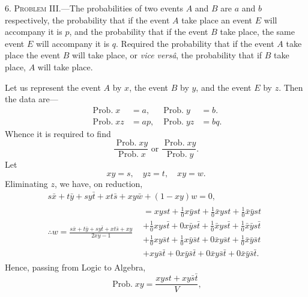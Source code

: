 \documentclass[oneside]{book}
\begin{document}
6. \textsc{Problem III.}---The probabilities of two events $A$ and $B$
are $a$ and $b$ respectively, the probability that if the event $A$ take
place an event $E$ will accompany it is $p$, and the probability that
if the event $B$ take place, the same event $E$ will accompany it
is $q$. Required the probability that if the event $A$ take place the
event $B$ will take place, or \textit{vice vers\^{a}}, the probability that if $B$
take place, $A$ will take place.

Let us represent the event $A$ by $x$, the event $B$ by $y$, and the
event $E$ by $z$. Then the data are---
\begin{align*}
\operatorname{Prob. } x & = a, & \operatorname{Prob. } y & = b. \\
\operatorname{Prob. } x z & = a p,& \operatorname{Prob. } y z & = b q.
\end{align*}
Whence it is required to find
\begin{equation*}
\frac{\operatorname{Prob. } x y}{\operatorname{Prob. } x} \text{ or }
\frac{\operatorname{Prob. } x y}{\operatorname{Prob. } y}.
\end{equation*}
Let
\begin{equation*}
xy=s, \quad yz = t, \quad xy=w.
\end{equation*}
Eliminating $z$, we have, on reduction,
\begin{gather*}
s \bar{x} + t \bar{y} + s y \bar{t} + x t \bar{s} + x y \bar{w}
+ (1 - x y)w = 0, \\
\therefore w = \frac{s \bar{x} + t \bar{y} + s y \bar{t}
+ x t \bar{s} + x y}{2 x y -1}
\begin{split}
& = xyst + \frac{1}{0}x\bar{y}st
  + \frac{1}{0}\bar{x}yst + \frac{1}{0}\bar{x}\bar{y}st
\\
& + \frac{1}{0}xys\bar{t} + 0 x\bar{y}s\bar{t}
  + \frac{1}{0}\bar{x}ys\bar{t} + \frac{1}{0}\bar{x}\bar{y}s\bar{t}
\\
& + \frac{1}{0}xy\bar{s}t + \frac{1}{0}x \bar{y}\bar{s}t
  + 0\bar{x}y\bar{s}t + \frac{1}{0}\bar{x}\bar{y}\bar{s}t
\\
& + xy\bar{s}\bar{t} + 0 x\bar{y}\bar{s}\bar{t}
+ 0\bar{x}y\bar{s}\bar{t} + 0 \bar{x}\bar{y}\bar{s}\bar{t}.
\end{split}
\tag{1}
\end{gather*}
Hence, passing from Logic to Algebra,
\begin{equation*}
\operatorname{Prob. } xy = \frac{xyst + xy\bar{s}\bar{t}}{V},
\end{equation*}
\end{document}
